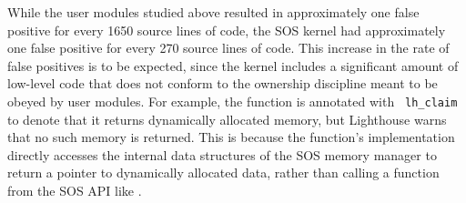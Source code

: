 While the user modules studied above resulted 
in approximately one false positive for every 1650 source lines of 
code, the SOS kernel had approximately one
false positive for every 270 source lines of code.  
This increase in the rate of false positives is to be expected, since
the kernel includes a significant amount of low-level code that does
not conform to the ownership discipline meant to be obeyed by user
modules.
For example,
the function  is annotated with {\tt
  lh\_claim} to denote that
it returns dynamically allocated memory, but Lighthouse warns that
no such memory is returned.  This is because the function's
implementation directly
accesses the internal data structures of the SOS memory manager to
return a pointer to dynamically allocated data, rather than calling a
function from the SOS API like 
.


%
% 

